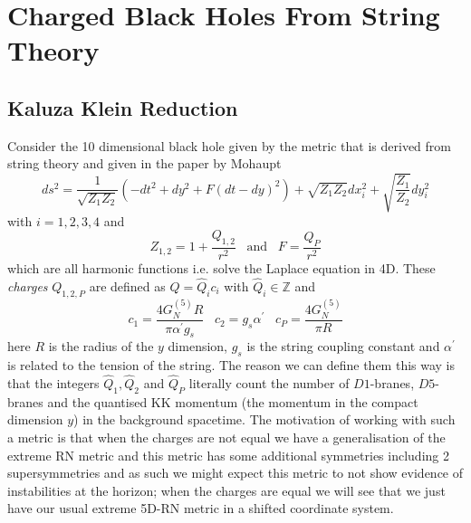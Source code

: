 \documentclass[12pt]{article}
\numberwithin{equation}{section}
\numberwithin{figure}{section}
\begin{document}
\section{Charged Black Holes From String Theory} %
\label{sec:5d_charged_black_holes_from_string_theory}
\subsection{Kaluza Klein Reduction} %
\label{sub:kaluza_klein_reduction}
Consider the 10 dimensional black hole given by the metric that is derived from string theory and given in the paper by Mohaupt\cite{Mohaupt:2000gc}
\begin{equation}
	ds^{2}=\frac{1}{\sqrt{Z_{1}Z_{2}}}\left(-dt^{2}+dy^{2}+F(dt-dy)^{2}\right)+\sqrt{Z_{1}Z_{2}}dx^{2}_{i}+\sqrt{\frac{Z_{1}}{Z_{2}}}dy_{i}^{2}
\end{equation}
with $i=1,2,3,4$ and
\begin{equation}
	Z_{1,2}=1+\frac{Q_{1,2}}{r^{2}} \;\;\;\text{and}\;\;\; F=\frac{Q_{P}}{r^{2}}
\end{equation}
which are all harmonic functions i.e. solve the Laplace equation in 4D. These \emph{charges} $Q_{1,2,P}$ are defined as $Q=\hat{Q}_{i}c_{i}$ with $\hat{Q}_{i}\in\mathbb{Z}$ and
\begin{equation}
	c_{1}=\frac{4G_{N}^{(5)}R}{\pi\alpha ^{\prime} g_{s}}\;\;\; c_{2}=g_{s}\alpha ^{\prime} \;\;\; c_{P}=\frac{4G_{N}^{(5)}}{\pi R} \label{eq:q_defintions}
\end{equation}
here $R$ is the radius of the $y$ dimension, $g_{s}$ is the string coupling constant and $\alpha^{\prime}$ is related to the tension of the string. The reason we can define them this way is that the integers $\hat{Q}_{1},\hat{Q}_{2}$ and $\hat{Q}_{P}$ literally count the number of $D1$-branes, $D5$-branes and the quantised KK momentum (the momentum in the compact dimension $y$) in the background spacetime. The motivation of working with such a metric is that when the charges are not equal we have a generalisation of the extreme RN metric and this metric has some additional symmetries including 2 supersymmetries and as such we might expect this metric to not show evidence of instabilities at the horizon; when the charges are equal we will see that we just have our usual extreme 5D-RN metric in a shifted coordinate system.
\end{document}
